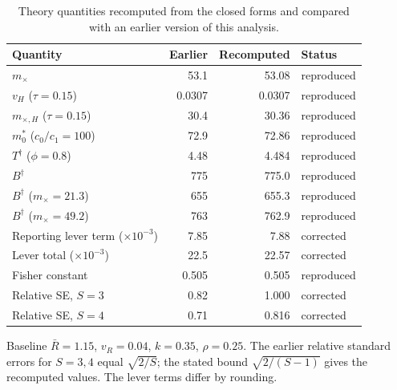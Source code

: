 \begin{table}[htbp]
\centering
\footnotesize
\caption{Theory quantities recomputed from the closed forms and compared with an earlier version of this analysis.}
\label{tab:s7}
\begin{tabular}{lrrl}
\toprule
Quantity & Earlier & Recomputed & Status \\
\midrule
$m_\times$ & 53.1 & 53.08 & reproduced \\
$v_H$ ($\tau=0.15$) & 0.0307 & 0.0307 & reproduced \\
$m_{\times,H}$ ($\tau=0.15$) & 30.4 & 30.36 & reproduced \\
$m_0^*$ ($c_0/c_1=100$) & 72.9 & 72.86 & reproduced \\
$T^\dagger$ ($\phi=0.8$) & 4.48 & 4.484 & reproduced \\
$B^\dagger$ & 775 & 775.0 & reproduced \\
$B^\dagger$ ($m_\times=21.3$) & 655 & 655.3 & reproduced \\
$B^\dagger$ ($m_\times=49.2$) & 763 & 762.9 & reproduced \\
Reporting lever term ($\times10^{-3}$) & 7.85 & 7.88 & corrected \\
Lever total ($\times10^{-3}$) & 22.5 & 22.57 & corrected \\
Fisher constant & 0.505 & 0.505 & reproduced \\
Relative SE, $S=3$ & 0.82 & 1.000 & corrected \\
Relative SE, $S=4$ & 0.71 & 0.816 & corrected \\
\bottomrule
\end{tabular}
\par\smallskip
\begin{minipage}{0.95\linewidth}\scriptsize Baseline $\bar{R}=1.15$, $v_R=0.04$, $k=0.35$, $\rho=0.25$. The earlier relative standard errors for $S=3,4$ equal $\sqrt{2/S}$; the stated bound $\sqrt{2/(S-1)}$ gives the recomputed values. The lever terms differ by rounding.\end{minipage}
\end{table}
